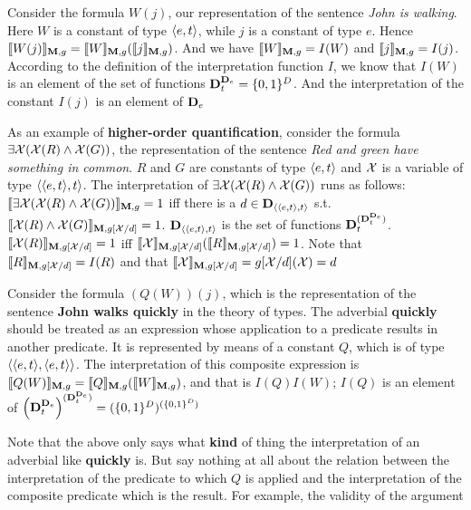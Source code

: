 \documentclass[11pt]{article}
\begin{document}
Consider the formula \(W(j)\), our representation of the sentence \emph{John is
walking}. Here \(W\) is a constant of type \(\langle e,t\rangle\), while \(j\) is a
constant of type \(e\). Hence \(\llbracket W(j)\rrbracket_{\operatorname{\textbf{M}},g}=\llbracket
    W\rrbracket_{\operatorname{\textbf{M}},g}(\llbracket j\rrbracket_{\operatorname{\textbf{M}},g})\). And we have
\(\llbracket W\rrbracket_{\operatorname{\textbf{M}},g}=I(W)\) and \(\llbracket
    j\rrbracket_{\operatorname{\textbf{M}},g}=I(j)\). According to the definition of the
interpretation function \(I\), we know that \(I(W)\) is an element of the
set of functions \(\operatorname{\textbf{D}}_t^{\operatorname{\textbf{D}}_e}=\{0,1\}^D\). And the interpretation of the
constant \(I(j)\) is an element of \(\operatorname{\textbf{D}}_e\)

As an example of \textbf{higher-order quantification}, consider the formula
\(\exists\mathcal{X}(\mathcal{X}(R)\wedge\mathcal{X}(G))\), the representation of the sentence
\emph{Red and green have something in common}. \(R\) and \(G\) are constants of
type \(\langle e,t\rangle\) and \(\mathcal{X}\) is a variable of type \(\langle\langle
    e,t\rangle,t\rangle\). The interpretation of
\(\exists\mathcal{X}(\mathcal{X}(R)\wedge\mathcal{X}(G))\) runs as follows:
\(\llbracket\exists\mathcal{X}(\mathcal{X}(R)\wedge\mathcal{X}(G))\rrbracket_{\operatorname{\textbf{M}},g}=1\) iff
there is a \(d\in\operatorname{\textbf{D}}_{\langle\langle e,t\rangle,t\rangle}\) s.t.
\(\llbracket\mathcal{X}(R)\wedge\mathcal{X}(G)\rrbracket_{\operatorname{\textbf{M}},g[\mathcal{X}/d]}=1\).
\(\operatorname{\textbf{D}}_{\langle\langle e,t\rangle,t\rangle}\) is the set of functions
\(\operatorname{\textbf{D}}_t^{(\operatorname{\textbf{D}}_t^{\operatorname{\textbf{D}}_e})}\).
\(\llbracket\mathcal{X}(R)\rrbracket_{\operatorname{\textbf{M}},g[\mathcal{X}/d]}=1\) iff
\(\llbracket\mathcal{X}\rrbracket_{\operatorname{\textbf{M}},g[\mathcal{X}/d]}(\llbracket
    R\rrbracket_{\operatorname{\textbf{M}},g[\mathcal{X}/d]})=1\). Note that
\(\llbracket R\rrbracket_{\operatorname{\textbf{M}},g[\mathcal{X}/d]}=I(R)\) and that
\(\llbracket\mathcal{X}\rrbracket_{\operatorname{\textbf{M}},g[\mathcal{X}/d]}=g[\mathcal{X}/d](\mathcal{X})=d\)


Consider the formula \((Q(W))(j)\), which is the representation of the
sentence \textbf{John walks quickly} in the theory of types. The adverbial \textbf{quickly}
should be treated as an expression whose application to a predicate results
in another predicate. It is represented by means of a constant \(Q\), which
is of type \(\langle\langle e,t\rangle,\langle e,t\rangle\rangle\). The interpretation of this
composite expression is
\(\llbracket Q(W)\rrbracket_{\operatorname{\textbf{M}},g}=\llbracket
    Q\rrbracket_{\operatorname{\textbf{M}},g}(\llbracket W\rrbracket_{\operatorname{\textbf{M}},g})\), and that is
\(I(Q)I(W)\); \(I(Q)\) is an element of
\(\left(\operatorname{\textbf{D}}_t^{\operatorname{\textbf{D}}_e}\right)^{(\operatorname{\textbf{D}}_t^{\operatorname{\textbf{D}}_e})}=
    (\{0,1\}^D)^{(\{0,1\}^D)}\)

Note that the above only says what \textbf{kind} of thing the interpretation of an
adverbial like \textbf{quickly} is. But say nothing at all about the relation between
the interpretation of the predicate to which \(Q\) is applied and the
interpretation of the composite predicate which is the result. For example,
the validity of the argument
\end{document}
